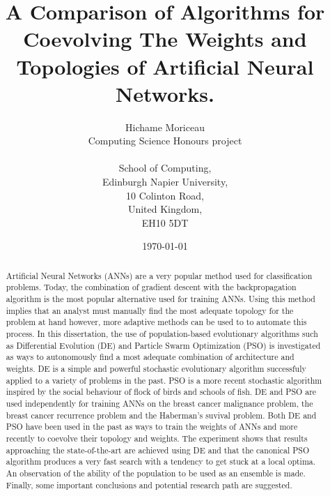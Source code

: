 \documentclass[a4paper,12pt, oneside]{memoir}
\begin{document}
\title{A Comparison of Algorithms for Coevolving The Weights and Topologies of Artificial Neural Networks.}
\author{Hichame Moriceau\\
  Computing Science Honours project\\ \\
  School of Computing,\\
  Edinburgh Napier University,\\
  10 Colinton Road,\\
  United Kingdom,\\
  EH10 5DT\\}
\date{\today}
\maketitle

\begin{abstract}
Artificial Neural Networks (ANNs) are a very popular method used for classification problems. Today, the combination of gradient descent with the backpropagation algorithm is the most popular alternative used for training ANNs. Using this method implies that an analyst must manually find the most adequate topology for the problem at hand however, more adaptive methods can be used to to automate this process. In this dissertation, the use of population-based evolutionary algorithms such as Differential Evolution (DE) and Particle Swarm Optimization (PSO) is investigated as ways to autonomously find a most adequate combination of architecture and weights. DE is a simple and powerful stochastic evolutionary algorithm successfuly applied to a variety of problems in the past. PSO is a more recent stochastic algorithm inspired by the social behaviour of flock of birds and schools of fish. DE and PSO are used independently for training ANNs on the breast cancer malignance problem, the breast cancer recurrence problem and the Haberman's suvival problem. Both DE and PSO have been used in the past as ways to train the weights of ANNs and more recently to coevolve their topology and weights. The experiment shows that results approaching the state-of-the-art are achieved using DE and that the canonical PSO algorithm produces a very fast search with a tendency to get stuck at a local optima. An observation of the ability of the population to be used as an ensemble is made. Finally, some important conclusions and potential research path are suggested.
\end{abstract}

\clearpage
\end{document}
